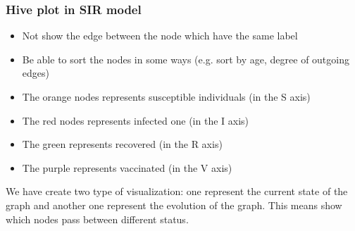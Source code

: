 \documentclass{beamer}
\begin{document}


\begin{frame}
\frametitle{Hive plot in SIR model}
\begin{itemize}
\item Not show the edge between the node which have the same label
\item Be able to sort the nodes in some ways (e.g. sort by age, degree of outgoing edges)
\item The orange nodes represents susceptible individuals (in the S axis)
\item The red nodes represents infected one (in the I axis)
\item The green represents recovered (in the R axis)
\item The purple represents vaccinated (in the V axis)
\end{itemize}
We have create two type of visualization: one represent the current state of the graph and another one represent the evolution of the graph. This means show which nodes pass between different status.
\end{frame}

\end{document}
